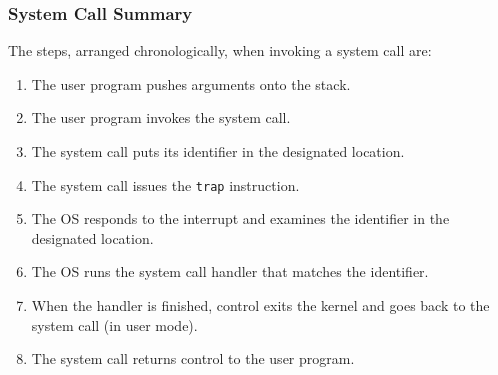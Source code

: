 \begin{frame}
	\frametitle{System Call Summary}

	The steps, arranged chronologically, when invoking a system call are:
	\begin{enumerate}
		\item The user program pushes arguments onto the stack.
		\item The user program invokes the system call.
		\item The system call puts its identifier in the designated location.
		\item The system call issues the \texttt{trap} instruction.
		\item The OS responds to the interrupt and examines the identifier in the designated location.
		\item The OS runs the system call handler that matches the identifier.
		\item When the handler is finished, control exits the kernel and goes back to the system call (in user mode).
		\item The system call returns control to the user program.

	\end{enumerate}


\end{frame}








